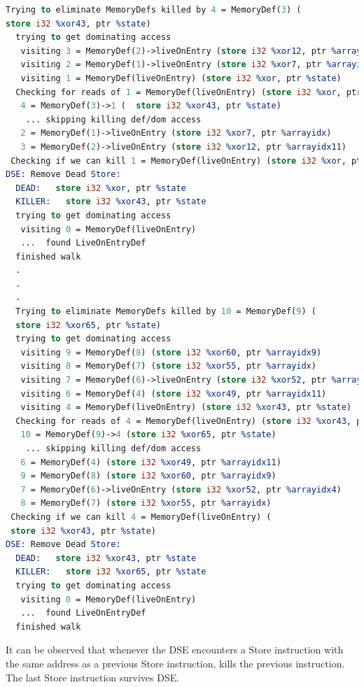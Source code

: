 \begin{lstlisting}[language=llvm, style=nasm, caption={Debug Output of DSE Pass from LLVM opt tool}]
Trying to eliminate MemoryDefs killed by 4 = MemoryDef(3) (
store i32 %xor43, ptr %state)
  trying to get dominating access
   visiting 3 = MemoryDef(2)->liveOnEntry (store i32 %xor12, ptr %arrayidx11)
   visiting 2 = MemoryDef(1)->liveOnEntry (store i32 %xor7, ptr %arrayidx)
   visiting 1 = MemoryDef(liveOnEntry) (store i32 %xor, ptr %state)
  Checking for reads of 1 = MemoryDef(liveOnEntry) (store i32 %xor, ptr %state)
   4 = MemoryDef(3)->1 (  store i32 %xor43, ptr %state)
    ... skipping killing def/dom access
   2 = MemoryDef(1)->liveOnEntry (store i32 %xor7, ptr %arrayidx)
   3 = MemoryDef(2)->liveOnEntry (store i32 %xor12, ptr %arrayidx11)
 Checking if we can kill 1 = MemoryDef(liveOnEntry) (store i32 %xor, ptr %state)
DSE: Remove Dead Store:
  DEAD:   store i32 %xor, ptr %state
  KILLER:   store i32 %xor43, ptr %state
  trying to get dominating access
   visiting 0 = MemoryDef(liveOnEntry)
   ...  found LiveOnEntryDef
  finished walk
  .
  .
  .
  Trying to eliminate MemoryDefs killed by 10 = MemoryDef(9) (
  store i32 %xor65, ptr %state)
  trying to get dominating access
   visiting 9 = MemoryDef(8) (store i32 %xor60, ptr %arrayidx9)
   visiting 8 = MemoryDef(7) (store i32 %xor55, ptr %arrayidx)
   visiting 7 = MemoryDef(6)->liveOnEntry (store i32 %xor52, ptr %arrayidx4)
   visiting 6 = MemoryDef(4) (store i32 %xor49, ptr %arrayidx11)
   visiting 4 = MemoryDef(liveOnEntry) (store i32 %xor43, ptr %state)
  Checking for reads of 4 = MemoryDef(liveOnEntry) (store i32 %xor43, ptr %state)
   10 = MemoryDef(9)->4 (store i32 %xor65, ptr %state)
    ... skipping killing def/dom access
   6 = MemoryDef(4) (store i32 %xor49, ptr %arrayidx11)
   9 = MemoryDef(8) (store i32 %xor60, ptr %arrayidx9)
   7 = MemoryDef(6)->liveOnEntry (store i32 %xor52, ptr %arrayidx4)
   8 = MemoryDef(7) (store i32 %xor55, ptr %arrayidx)
 Checking if we can kill 4 = MemoryDef(liveOnEntry) (
 store i32 %xor43, ptr %state)
DSE: Remove Dead Store:
  DEAD:   store i32 %xor43, ptr %state
  KILLER:   store i32 %xor65, ptr %state
  trying to get dominating access
   visiting 0 = MemoryDef(liveOnEntry)
   ...  found LiveOnEntryDef
  finished walk
\end{lstlisting}

It can be observed that whenever the DSE encounters a Store instruction with the same address as a previous Store instruction, kills the previous instruction. The last Store instruction survives DSE.

